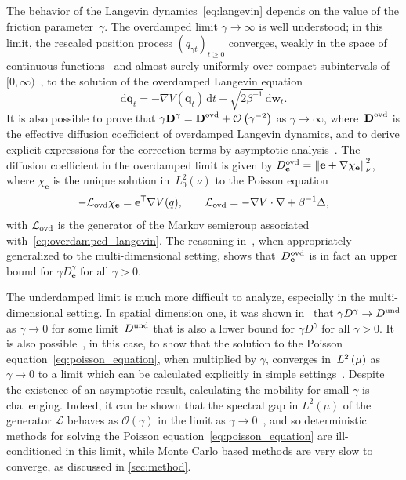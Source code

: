 \documentclass[11pt,a4paper]{article}
\newcommand{\laplacian}{\Delta}
\newcommand{\grad}{\nabla}
\newcommand{\vect}[1]{\boldsymbol{\mathbf #1}}
\newcommand{\mat}[1]{\vect #1}
\renewcommand{\d}{\mathrm d}
\renewcommand{\t}{\mathsf T}
\theoremstyle{plain}
\numberwithin{equation}{section}
\renewcommand{\geq}{\geqslant}
\begin{document}
The behavior of the Langevin dynamics~\eqref{eq:langevin} depends on the value of the friction parameter~$\gamma$.
The overdamped limit $\gamma \to \infty$ is well understood;
in this limit, the rescaled position process $(q_{\gamma t})_{t \geq 0}$
converges, weakly in the space of continuous functions~\cite{MR4054345}
and almost surely uniformly over compact subintervals of $[0, \infty)$~\cite[Theorem 10.1]{MR0214150},
to the solution of the overdamped Langevin equation
\begin{equation}
    \label{eq:overdamped_langevin}
    \d \vect q_t = - \grad V(\vect q_t) \, \d t + \sqrt{2 \beta^{-1}} \, \d \vect w_t.
\end{equation}
It is also possible to prove that $\gamma \mat D^{\gamma} = \mat D^{\rm ovd} + \bigo{\gamma^{-2}}$ as $\gamma \to \infty$,
where~$\mat D^{\rm ovd}$ is the effective diffusion coefficient of overdamped Langevin dynamics,
and to derive explicit expressions for the correction terms by asymptotic analysis~\cite{MR2394704}.
The diffusion coefficient in the overdamped limit is given by $D^{\rm ovd}_{\vect e} = \norm{\vect e + \grad \chi_{\vect e}}[\nu]^2$,
where $\chi_{\vect e}$ is the unique solution in~$L^2_0(\nu)$ to the Poisson equation
\[
    - \mathcal L_{\rm ovd} \chi_{\vect e} = \vect e^\t \grad V(q), \qquad \mathcal L_{\rm ovd} = - \grad V \cdot \grad + \beta^{-1} \laplacian,
\]
with $\mathcal L_{\rm ovd}$ is the generator of the Markov semigroup associated with~\eqref{eq:overdamped_langevin}.
The reasoning in~\cite[Proposition 4.1]{MR2394704},
when appropriately generalized to the multi-dimensional setting,
shows that~$D^{\rm ovd}_{\vect e}$ is in fact an upper bound for $\gamma D^{\gamma}_{\vect e}$ for all $\gamma > 0$.

The underdamped limit is much more difficult to analyze,
especially in the multi-dimensional setting.
In spatial dimension one, it was shown in~\cite{MR2394704} that $\gamma D^{\gamma} \to D^{\rm und}$ as $\gamma \to 0$ for some limit~$D^{\rm und}$
that is also a lower bound for $\gamma D^{\gamma}$ for all $\gamma > 0$.
It is also possible~\cite[Lemma 3.4]{MR2394704}, in this case,
to show that the solution to the Poisson equation~\eqref{eq:poisson_equation},
when multiplied by $\gamma$, converges in~$\lp{2}{\mu}$ as $\gamma \to 0$ to a limit
which can be calculated explicitly in simple settings~\cite{MR2427108}.
Despite the existence of an asymptotic result,
calculating the mobility for small $\gamma$ is challenging.
Indeed, it can be shown that the spectral gap in $L^2(\mu)$ of the generator $\mathcal L$ behaves as $\mathcal O(\gamma)$ in the limit as $\gamma \to 0$~\cite{MR2394704},
and so deterministic methods for solving the Poisson equation~\eqref{eq:poisson_equation} are ill-conditioned in this limit,
while Monte Carlo based methods are very slow to converge,
as discussed in \cref{sec:method}.
\end{document}
